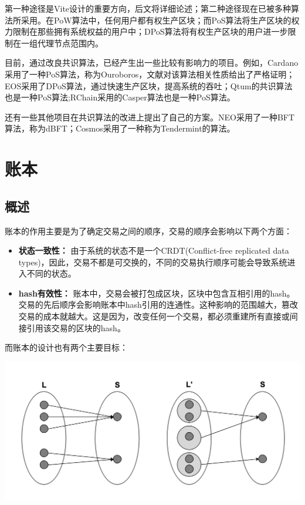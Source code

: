 \documentclass[UTF8,nofonts]{ctexart}
\begin{document}
\begin{multicols}{2}
第一种途径是Vite设计的重要方向，后文将详细论述；第二种途径现在已被多种算法所采用。在PoW算法中，任何用户都有权生产区块；而PoS算法将生产区块的权力限制在那些拥有系统权益的用户中；DPoS算法\cite{dpos}将有权生产区块的用户进一步限制在一组代理节点范围内。
	
目前，通过改良共识算法，已经产生出一些比较有影响力的项目。例如，Cardano采用了一种PoS算法，称为Ouroboros，文献\cite{bernardo2017ouroboros}对该算法相关性质给出了严格证明；EOS采用了DPoS算法，通过快速生产区块，提高系统的吞吐；Qtum\cite{dai2017smart}的共识算法也是一种PoS算法;RChain采用的Casper算法也是一种PoS算法。

还有一些其他项目在共识算法的改进上提出了自己的方案。NEO采用了一种BFT算法，称为dBFT；Cosmos采用了一种称为Tendermint\cite{tendermint}的算法。

\section{账本}
\subsection{概述}
账本的作用主要是为了确定交易之间的顺序，交易的顺序会影响以下两个方面：
\begin{itemize}
	\item \textbf{状态一致性：} 由于系统的状态不是一个CRDT(Conflict-free replicated data types)\cite{crdt}，因此，交易不都是可交换的，不同的交易执行顺序可能会导致系统进入不同的状态。
	\item \textbf{hash有效性：} 账本中，交易会被打包成区块，区块中包含互相引用的hash。交易的先后顺序会影响账本中hash引用的连通性。这种影响的范围越大，篡改交易的成本就越大。这是因为，改变任何一个交易，都必须重建所有直接或间接引用该交易的区块的hash。
\end{itemize}

而账本的设计也有两个主要目标：

\includegraphics[width=.9\linewidth]{image/ledger-merge.png}


\end{multicols}
\end{document}
